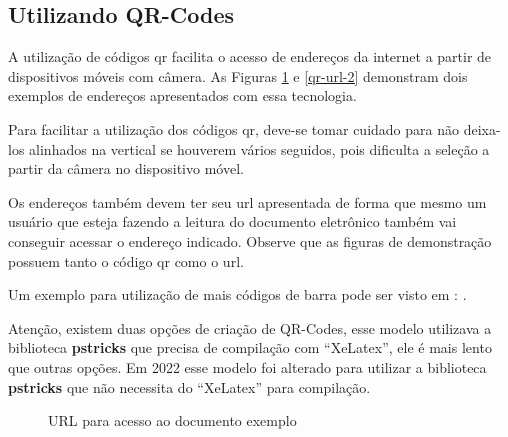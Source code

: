 \subsection{Utilizando QR-Codes}


A utilização de códigos \ac{qr} facilita o acesso de endereços da internet a partir de dispositivos móveis com câmera.
As Figuras \ref{qr-url-1} e \ref{qr-url-2} demonstram dois exemplos de endereços apresentados com essa tecnologia.


Para facilitar a utilização dos códigos \ac{qr}, deve-se tomar cuidado para não deixa-los alinhados na vertical se houverem vários seguidos, pois dificulta a seleção a partir da câmera no dispositivo móvel.

Os endereços também devem ter seu \ac{url} apresentada de forma que mesmo um usuário que esteja fazendo a leitura do documento eletrônico também vai conseguir acessar o endereço indicado. Observe que as figuras de demonstração possuem tanto o código \ac{qr} como o \ac{url}.

Um exemplo para utilização de mais códigos de barra pode ser visto em : \urlmodelo.

Atenção, existem duas opções de criação de QR-Codes, esse modelo utilizava a biblioteca \textbf{pstricks} que precisa de compilação com  \enquote{XeLatex}, ele é mais lento que outras opções. Em 2022 esse modelo foi alterado para utilizar a biblioteca \textbf{pstricks} que não necessita do \enquote{XeLatex} para compilação.


\begin{figure}[htb]
\caption{\label{qr-url-1}URL para acesso ao documento exemplo}


\qrcode{\urlmodelosimples}
\legend{\urlmodelo}
\end{figure}



